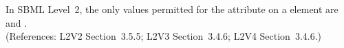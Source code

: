 In SBML Level~2, the only values permitted for the
 attribute on a  element are
 and
.\\
(References: L2V2 Section~3.5.5; L2V3 Section~3.4.6; L2V4 Section~3.4.6.)
